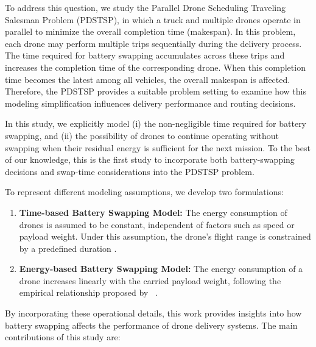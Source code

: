\documentclass[3p, authoryear, 11pt]{elsarticle}
\begin{document}
To address this question, we study the Parallel Drone Scheduling Traveling Salesman Problem (PDSTSP), in which a truck and multiple drones operate in parallel to minimize the overall completion time (makespan). In this problem, each drone may perform multiple trips sequentially during the delivery process. The time required for battery swapping accumulates across these trips and increases the completion time of the corresponding drone. When this completion time becomes the latest among all vehicles, the overall makespan is affected. Therefore, the PDSTSP provides a suitable problem setting to examine how this modeling simplification influences delivery performance and routing decisions.

In this study, we explicitly model (i) the non-negligible time required for battery swapping, and (ii) the possibility of drones to continue operating without swapping when their residual energy is sufficient for the next mission.
To the best of our knowledge, this is the first study to incorporate both battery-swapping decisions and swap-time considerations into the PDSTSP problem.

To represent different modeling assumptions, we develop two formulations:

\begin{enumerate}
    \item \textbf{Time-based Battery Swapping Model:} The energy consumption of drones is assumed to be constant, independent of factors such as speed or payload weight. Under this assumption, the drone's flight range is constrained by a predefined duration \cite{murray_flying_2015}. %
    \item \textbf{Energy-based Battery Swapping Model:} The energy consumption of a drone increases linearly with the carried payload weight, following the empirical relationship proposed by ~\cite{dorling_vehicle_2017}.
\end{enumerate}

By incorporating these operational details, this work provides insights into how battery swapping affects the performance of drone delivery systems. The main contributions of this study are:
\end{document}

